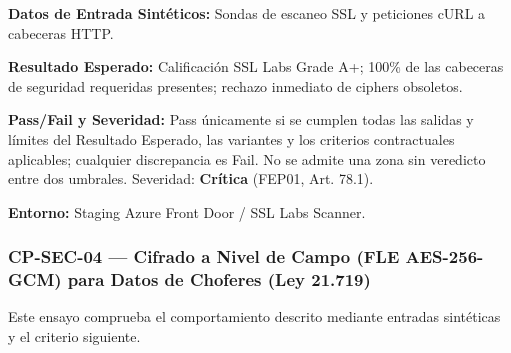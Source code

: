 \par\noindent\textbf{Datos de Entrada Sintéticos:} Sondas de escaneo SSL y peticiones cURL a cabeceras HTTP.\par
\par\noindent\textbf{Resultado Esperado:} Calificación SSL Labs Grade A+; 100\% de las cabeceras de seguridad requeridas presentes; rechazo inmediato de ciphers obsoletos.\par
\par\noindent\textbf{Pass/Fail y Severidad:} Pass únicamente si se cumplen todas las salidas y límites del Resultado Esperado, las variantes y los criterios contractuales aplicables; cualquier discrepancia es Fail. No se admite una zona sin veredicto entre dos umbrales. Severidad: \textbf{Crítica} (FEP01, Art. 78.1).\par
\par\noindent\textbf{Entorno:} Staging Azure Front Door / SSL Labs Scanner.\par






\subsubsection*{CP-SEC-04 — Cifrado a Nivel de Campo (FLE AES-256-GCM) para Datos de Choferes (Ley 21.719)}\label{sec:9-cp-sec-04}
Este ensayo comprueba el comportamiento descrito mediante entradas sintéticas y el criterio siguiente.

